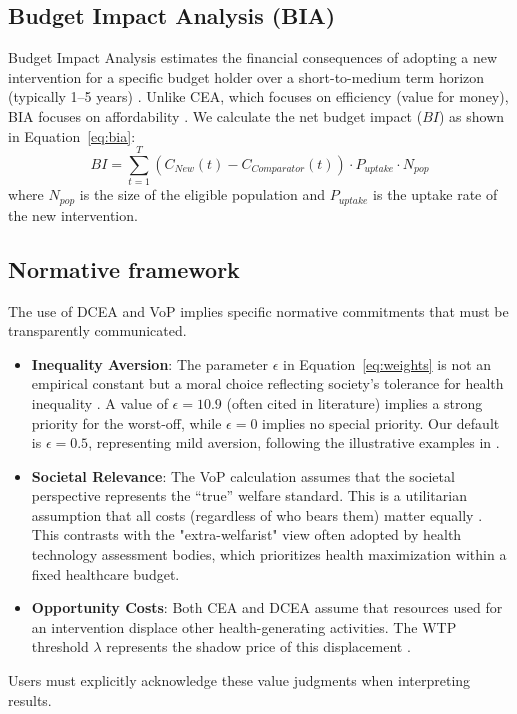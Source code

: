 \documentclass{article}
\begin{document}
\subsection{Budget Impact Analysis (BIA)}
Budget Impact Analysis estimates the financial consequences of adopting a new intervention for a specific budget holder over a short-to-medium term horizon (typically 1--5 years) \citep{sullivan2014}.
Unlike CEA, which focuses on efficiency (value for money), BIA focuses on affordability \citep{sullivan2014}.
We calculate the net budget impact ($BI$) as shown in Equation~\ref{eq:bia}:
\begin{equation} \label{eq:bia}
BI = \sum_{t=1}^{T} (C_{New}(t) - C_{Comparator}(t)) \cdot P_{uptake} \cdot N_{pop}
\end{equation}
where $N_{pop}$ is the size of the eligible population and $P_{uptake}$ is the uptake rate of the new intervention.

\subsection{Normative framework}
The use of DCEA and VoP implies specific normative commitments that must be transparently communicated.
\begin{itemize}
    \item \textbf{Inequality Aversion}: The parameter $\epsilon$ in Equation~\ref{eq:weights} is not an empirical constant but a moral choice reflecting society's tolerance for health inequality \citep{atkinson1970}. A value of $\epsilon=10.9$ (often cited in literature) implies a strong priority for the worst-off, while $\epsilon=0$ implies no special priority. Our default is $\epsilon=0.5$, representing mild aversion, following the illustrative examples in \cite{cookson2017}.
    \item \textbf{Societal Relevance}: The VoP calculation assumes that the societal perspective represents the ``true'' welfare standard. This is a utilitarian assumption that all costs (regardless of who bears them) matter equally \citep{brouwer2008}. This contrasts with the "extra-welfarist" view often adopted by health technology assessment bodies, which prioritizes health maximization within a fixed healthcare budget.
    \item \textbf{Opportunity Costs}: Both CEA and DCEA assume that resources used for an intervention displace other health-generating activities. The WTP threshold $\lambda$ represents the shadow price of this displacement \citep{claxton2010}.
\end{itemize}
Users must explicitly acknowledge these value judgments when interpreting results.
\end{document}
